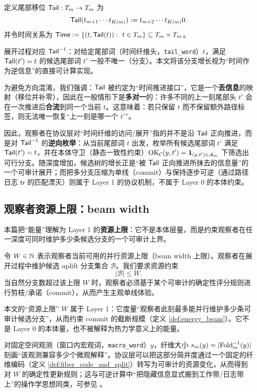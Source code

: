 \begin{definition}[规范时间算子]\label{def:tail_shift}
定义尾部移位 \(\mathsf{Tail}:T_m\to T_m\) 为
$$
\mathsf{Tail}(t_{m+1}\cdots t_{K(m)}) := t_{m+2}\cdots t_{K(m)}0.
$$
并令时间关系为 \(\mathsf{Time}:=\{(t,\mathsf{Tail}(t)):\ t\in T_m\}\subseteq T_m\times T_m\)。
\end{definition}

\begin{remark}[展开过程与分支]
展开过程对应 \(\mathsf{Tail}^{-1}\)：对给定尾部词（时间纤维头，\texttt{tail\_word}）\(t\)，满足 \(\mathsf{Tail}(t')=t\) 的候选尾部词 \(t'\) 一般不唯一（分支）。本文将该分支增长视为“时间作为逆信息”的直接可计算实现。
\par
为避免方向混淆，我们强调：\(\mathsf{Tail}\) 被约定为“时间推进接口”，它是一个\textbf{丢信息}的映射（移位并补零），因此在一般情形下是\textbf{多对一}的：许多不同的上一刻尾部头 \(t'\) 会在一次推进后\textbf{合流}到同一个当前 \(t\)。这意味着：若只保留 \(t\) 而不保留额外路径标签，则无法唯一恢复“上一刻是哪一个 \(t'\)”。
\par
因此，观察者在协议层对“时间纤维的访问/展开”指的并不是沿 \(\mathsf{Tail}\) 正向推进，而是对 \(\mathsf{Tail}^{-1}\) 的\textbf{逆向枚举}：从当前尾部词 \(t\) 出发，枚举所有候选尾部词 \(t'\) 满足 \(\mathsf{Tail}(t')=t\)，并在本体守卫（静态一致性约束）\(\mathrm{OK}_{\mathcal{C}}(y,t')=\mathbf 1_{(y,t')\in\mathcal A_m}\) 下筛选出可行分支。随深度增加，候选树的增长正是“被 \(\mathsf{Tail}\) 正向推进所抹去的信息量”的一个可审计展开；而把多分支压缩为单线（commit）与保持逐步可逆（通过路径日志 \(\mathsf{tr}\) 的匹配湮灭）则属于 Layer 1 的协议机制，不属于 Layer 0 的本体约束。
\end{remark}

\subsection{观察者资源上限：beam width}
\begin{definition}\label{def:energy_beam}
本篇把“能量”理解为 Layer 1 的\textbf{资源上限}：它不是本体层量，而是约束观察者在任一深度可同时维护多少条候选分支的一个可审计上界。

令 \(W\in\mathbb{N}\) 表示观察者当前可用的并行资源上限（beam width 上限）。观察者在展开过程中维护候选 uplift 分支集合 \(\mathcal B\)。我们要求资源约束
$$
|\mathcal B|\le W.
$$
当自然分支数超过该上限 \(W\) 时，观察者必须基于某个可审计的确定性评分规则进行剪枝/承诺（commit），从而产生主观单线体验。
\end{definition}

\begin{remark}\label{rem:energy_mined_from_uplift}
本文的“资源上限” \(W\) 属于 Layer 1：它度量“观察者此刻最多能并行维护多少条可审计候选分支”，从而约束 commit 的截断规模（定义 \ref{def:energy_beam}）。它不是 Layer 0 的本体量，也不被解释为热力学意义上的能量。

对固定空间观测（窗口内宏观词，\texttt{macro\_word}）\(y\)，纤维大小 \(s_m(y)=|\mathrm{Fold}_m^{-1}(y)|\) 刻画“该观测兼容多少个微观解释”。协议层可以把这部分简并度通过一个固定的纤维编码（定义 \ref{def:fiber_code_and_split}）转写为可审计的资源变化，从而得到对 \(W\) 的确定性更新规则；这与可逆计算中“把隐藏信息显式搬到工作带/日志带上”的操作学思想同类，可参见 \cite{Bennett1973,Landauer1961}。
\end{remark}

